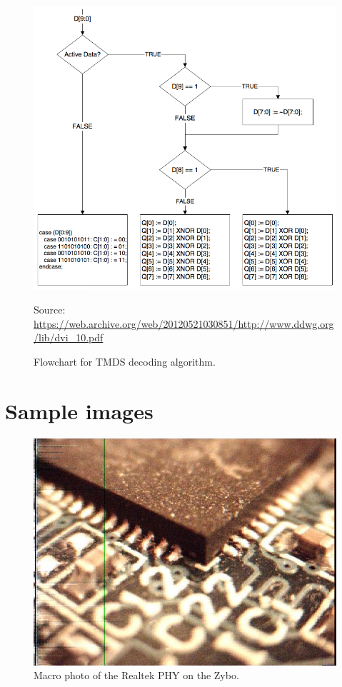 \begin{appendices}
\begin{figure}
  \centering
  \includegraphics[width=1\textwidth]{./img/tmds_decode.png}\par
Source: \url{https://web.archive.org/web/20120521030851/http://www.ddwg.org/lib/dvi_10.pdf}
  \caption{Flowchart for TMDS decoding algorithm.}
  \label{fig:tmds_decoding_algorithm}
\end{figure}

\chapter{Sample images}
\begin{figure}
  \centering
  \includegraphics[width=1\textwidth]{./img/ov7670_pcb.jpg}
  \caption{Macro photo of the Realtek PHY on the Zybo.}
  \label{fig:ov7670_pcb}
\end{figure}


\end{appendices}
